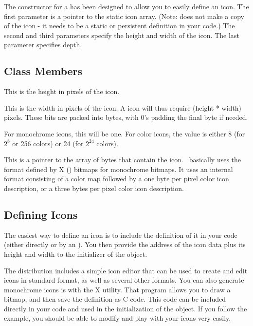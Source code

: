 
The constructor for a  has been designed to allow you to
easily define an icon. The first parameter is a pointer to the static icon
array. (Note:  does not make a copy of the icon - it
needs to be a static or persistent definition in your code.) The second and third
parameters specify the height and width of the icon. The last
parameter specifies depth.

\subsection* {Class Members}

 This is the height in pixels of the icon.

 This is the width in pixels of the icon. A icon
will thus require (height * width) pixels.  These bits are packed
into bytes, with 0's padding the final byte if needed.

 For monochrome icons, this will be one.
For color icons, the value is either 8 (for $2^{8}$ or 256 colors) or 24
(for $2^{24}$ colors).

 This is a pointer to the array of
bytes that contain the icon. \V\ basically uses the format
defined by X () bitmaps for monochrome bitmaps.
It uses an internal format consisting of a color map followed
by a one byte per pixel color icon description, or a three
bytes per pixel color icon description.

\subsection* {Defining Icons}

The easiest way to define an icon is to include the definition of
it in your code (either directly or by an ).
You then provide the address of the icon data plus its height and
width to the initializer of the  object.

The \V distribution includes a simple icon editor that can
be used to create and edit icons in standard  format,
as well as several other formats.
You can also generate monochrome icons is with the X
 utility. That program allows you to
draw a bitmap, and then save the definition as C code. This code
can be included directly in your code and used in the initialization
of the  object.  If you follow the example, you should
be able to modify and play with your icons very easily.

